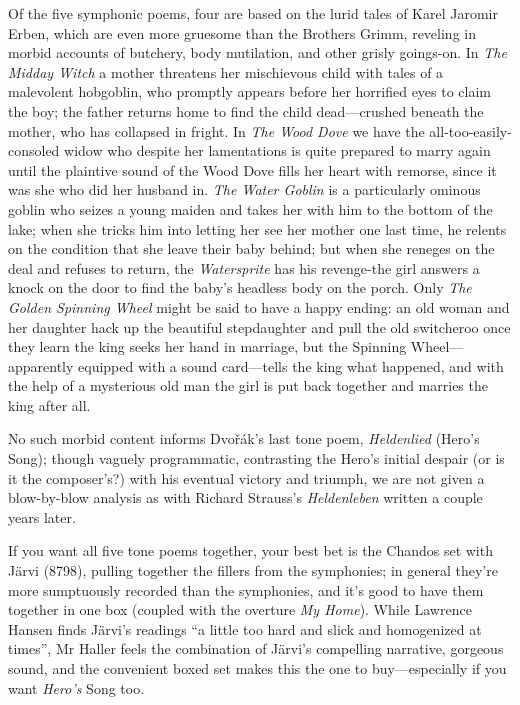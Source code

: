 \documentclass[12pt]{article}%
\begin{document}
Of the five symphonic poems, four are based on the lurid tales of Karel Jaromir Erben, which are even more gruesome than the Brothers Grimm, reveling in morbid accounts of butchery, body mutilation, and other grisly goings-on. In {\it The Midday Witch} a mother threatens her mischievous child with tales of a malevolent hobgoblin, who promptly appears before her horrified eyes to claim the boy; the father returns home to find the child dead---crushed beneath the mother, who has collapsed in fright. In {\it The Wood Dove} we have the all-too-easily-consoled widow who despite her lamentations is quite prepared to marry again until the plaintive sound of the Wood Dove fills her heart with remorse, since it was she who did her husband in. {\it The Water Goblin} is a particularly ominous goblin who seizes a young maiden and takes her with him to the bottom of the lake; when she tricks him into letting her see her mother one last time, he relents on the condition that she leave their baby behind; but when she reneges on the deal and refuses to return, the {\it Watersprite} has his revenge-the girl answers a knock on the door to find the baby's headless body on the porch. Only {\it The Golden Spinning Wheel} might be said to have a happy ending: an old woman and her daughter hack up the beautiful stepdaughter and pull the old switcheroo once they learn the king seeks her hand in marriage, but the Spinning Wheel---apparently equipped with a sound card---tells the king what happened, and with the help of a mysterious old man the girl is put back together and marries the king after all.

No such morbid content informs Dvořák's last tone poem, {\it Heldenlied} (Hero's Song); though vaguely programmatic, contrasting the Hero's initial despair (or is it the composer's?) with his eventual victory and triumph, we are not given a blow-by-blow analysis as with Richard Strauss's {\it Heldenleben} written a couple
years later.

If you want all five tone poems together, your best bet is the Chandos set with Järvi
(8798), pulling together the fillers from the symphonies; in general they're more sumptuously recorded than the symphonies, and it's good to have them together in one box (coupled with the overture {\it My Home}). While Lawrence Hansen finds Järvi's readings ``a little too hard and slick and homogenized at times'', Mr Haller feels the combination of Järvi's compelling narrative, gorgeous sound, and the convenient boxed set makes this the one to buy---especially if you want {\it Hero's} Song too.
\end{document}

